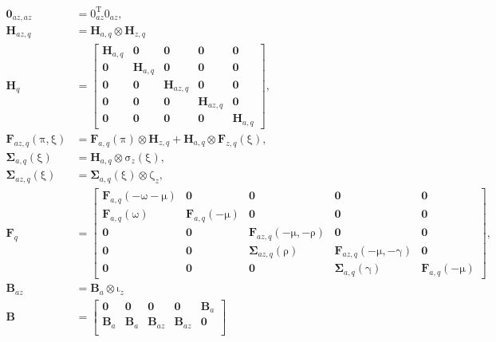 \documentclass[USenglish]{article}
\renewcommand{\vec}[1]{\boldsymbol{\mathrm{#1}}}
\newcommand{\mat}[1]{\mathbf{#1}}
\begin{document}
\begin{subequations}
\begin{align}
    \\
    \mat{0}_{az,az} &=
    \vec{0}_{az}^{\mathrm{T}} \vec{0}_{az},
    \\
    \mat{H}_{az,q} &=
    \mat{H}_{a, q} \otimes \mat{H}_{z, q}
    \\
    \mat{H}_q &=
    \begin{bmatrix}
      \mat{H}_{a, q} & \mat{0} & \mat{0} & \mat{0} & \mat{0} \\
      \mat{0} & \mat{H}_{a, q} & \mat{0} & \mat{0} & \mat{0} \\
      \mat{0} & \mat{0} & \mat{H}_{az, q} & \mat{0} & \mat{0} \\
      \mat{0} & \mat{0} & \mat{0} & \mat{H}_{az, q} & \mat{0} \\
      \mat{0} & \mat{0} & \mat{0} & \mat{0} & \mat{H}_{a, q}
    \end{bmatrix},
    \\
    \mat{F}_{az, q}(\vec{\pi}, \vec{\xi}) &=
    \mat{F}_{a, q} (\vec{\pi}) \otimes \mat{H}_{z, q}
    + \mat{H}_{a, q} \otimes \mat{F}_{z, q}(\vec{\xi}),
    \\
    \mat{\Sigma}_{a, q}(\vec{\xi}) &=
    \mat{H}_{a, q} \otimes \vec{\sigma}_z(\vec{\xi}),
    \\
    \mat{\Sigma}_{az, q}(\vec{\xi}) &=
    \mat{\Sigma}_{a, q}(\vec{\xi}) \otimes \vec{\zeta}_z,
    \\
    \mat{F}_q &=
    \begin{bmatrix}
      \mat{F}_{a, q}(- \vec{\omega} - \vec{\mu}) & \mat{0} & \mat{0}
      & \mat{0} & \mat{0}
      \\
      \mat{F}_{a, q}(\vec{\omega}) & \mat{F}_{a, q}(- \vec{\mu})
      & \mat{0} & \mat{0} & \mat{0}
      \\
      \mat{0} & \mat{0} & \mat{F}_{az, q}(- \vec{\mu}, - \vec{\rho})
      & \mat{0} & \mat{0}
      \\
      \mat{0} & \mat{0} & \mat{\Sigma}_{az, q}(\vec{\rho})
      & \mat{F}_{az, q}(- \vec{\mu}, - \vec{\gamma}) & \mat{0}
      \\
      \mat{0} & \mat{0} & \mat{0} & \mat{\Sigma}_{a, q}(\vec{\gamma})
      & \mat{F}_{a, q}(- \vec{\mu})
    \end{bmatrix},
    \\
    \mat{B}_{az} &=
    \mat{B}_a \otimes \vec{\iota}_z
    \\
    \mat{B} &=
    \begin{bmatrix}
      \mat{0} & \mat{0} & \mat{0} & \mat{0} & \mat{B}_a \\
      \mat{B}_a & \mat{B}_a & \mat{B}_{az} & \mat{B}_{az} & \mat{0} \\

\end{bmatrix}
\end{align}
\end{subequations}
\end{document}
